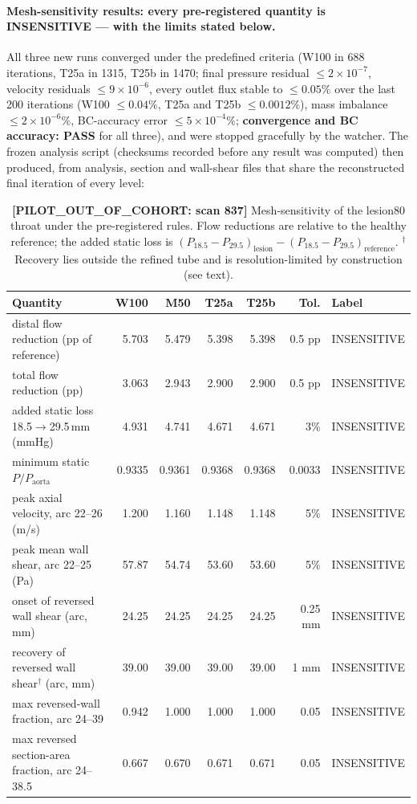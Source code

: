 \documentclass[11pt]{article}
\newcommand{\PASS}{\textcolor{passgreen}{\textbf{PASS}}}
\begin{document}
\paragraph{Mesh-sensitivity results: every pre-registered quantity is INSENSITIVE --- with the limits stated below.}
\label{sec:sens-results}
All three new runs converged under the predefined criteria (W100 in 688 iterations, T25a in 1315, T25b in 1470; final pressure residual $\leq2\times10^{-7}$, velocity residuals $\leq9\times10^{-6}$, every outlet flux stable to $\leq0.05\%$ over the last 200 iterations (W100 $\leq0.04\%$, T25a and T25b $\leq0.0012\%$), mass imbalance $\leq2\times10^{-6}\%$, BC-accuracy error $\leq5\times10^{-4}\%$; \textbf{convergence and BC accuracy: \PASS{}} for all three), and were stopped gracefully by the watcher.
The frozen analysis script (checksums recorded before any result was computed) then produced, from analysis, section and wall-shear files that share the reconstructed final iteration of every level:

\begin{table}[H]
\centering
\caption{\textbf{[PILOT\_OUT\_OF\_COHORT: scan 837]} Mesh-sensitivity of the lesion80 throat under the pre-registered rules. Flow reductions are relative to the healthy reference; the added static loss is $(P_{18.5}-P_{29.5})_\text{lesion}-(P_{18.5}-P_{29.5})_\text{reference}$. $^{\dagger}$Recovery lies outside the refined tube and is resolution-limited by construction (see text).}
\small
\setlength{\tabcolsep}{4pt}
\begin{tabular}{>{\raggedright\arraybackslash}p{7.0cm}rrrrrl}
\toprule
Quantity & W100 & M50 & T25a & T25b & Tol. & Label \\
\midrule
distal flow reduction (pp of reference) & 5.703 & 5.479 & 5.398 & 5.398 & 0.5 pp & INSENSITIVE \\
total flow reduction (pp) & 3.063 & 2.943 & 2.900 & 2.900 & 0.5 pp & INSENSITIVE \\
added static loss 18.5$\to$29.5\,mm (mmHg) & 4.931 & 4.741 & 4.671 & 4.671 & 3\% & INSENSITIVE \\
minimum static $P/P_\text{aorta}$ & 0.9335 & 0.9361 & 0.9368 & 0.9368 & 0.0033 & INSENSITIVE \\
peak axial velocity, arc 22--26 (m/s) & 1.200 & 1.160 & 1.148 & 1.148 & 5\% & INSENSITIVE \\
peak mean wall shear, arc 22--25 (Pa) & 57.87 & 54.74 & 53.60 & 53.60 & 5\% & INSENSITIVE \\
onset of reversed wall shear (arc, mm) & 24.25 & 24.25 & 24.25 & 24.25 & 0.25 mm & INSENSITIVE \\
recovery of reversed wall shear$^{\dagger}$ (arc, mm) & 39.00 & 39.00 & 39.00 & 39.00 & 1 mm & INSENSITIVE \\
max reversed-wall fraction, arc 24--39 & 0.942 & 1.000 & 1.000 & 1.000 & 0.05 & INSENSITIVE \\
max reversed section-area fraction, arc 24--38.5 & 0.667 & 0.670 & 0.671 & 0.671 & 0.05 & INSENSITIVE \\
\bottomrule
\end{tabular}
\end{table}
\end{document}
